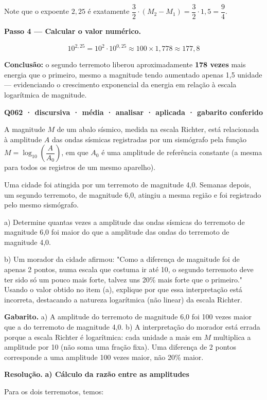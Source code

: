 \documentclass[11pt,a4paper]{article}
\begin{document}
Note que o expoente $2{,}25$ é exatamente $\dfrac{3}{2}\cdot(M_2-M_1) = \dfrac{3}{2}\cdot 1{,}5 = \dfrac{9}{4}$.

\textbf{Passo 4 — Calcular o valor numérico.}

$$10^{2{,}25} = 10^2 \cdot 10^{0{,}25} \approx 100 \times 1{,}778 \approx 177{,}8$$

\textbf{Conclusão:} o segundo terremoto liberou aproximadamente \textbf{178 vezes} mais energia que o primeiro, mesmo a magnitude tendo aumentado apenas 1,5 unidade — evidenciando o crescimento exponencial da energia em relação à escala logarítmica de magnitude.

\bigskip\noindent\textbf{Q062 · discursiva · média · analisar · aplicada · gabarito conferido}\par\nopagebreak
A magnitude $M$ de um abalo sísmico, medida na escala Richter, está relacionada à amplitude $A$ das ondas sísmicas registradas por um sismógrafo pela função $M = \log_{10}\left(\dfrac{A}{A_0}\right)$, em que $A_0$ é uma amplitude de referência constante (a mesma para todos os registros de um mesmo aparelho).

Uma cidade foi atingida por um terremoto de magnitude 4,0. Semanas depois, um segundo terremoto, de magnitude 6,0, atingiu a mesma região e foi registrado pelo mesmo sismógrafo.

a) Determine quantas vezes a amplitude das ondas sísmicas do terremoto de magnitude 6,0 foi maior do que a amplitude das ondas do terremoto de magnitude 4,0.

b) Um morador da cidade afirmou: "Como a diferença de magnitude foi de apenas 2 pontos, numa escala que costuma ir até 10, o segundo terremoto deve ter sido só um pouco mais forte, talvez uns 20\% mais forte que o primeiro." Usando o valor obtido no item (a), explique por que essa interpretação está incorreta, destacando a natureza logarítmica (não linear) da escala Richter.

\textbf{Gabarito.} a) A amplitude do terremoto de magnitude 6,0 foi 100 vezes maior que a do terremoto de magnitude 4,0. b) A interpretação do morador está errada porque a escala Richter é logarítmica: cada unidade a mais em $M$ multiplica a amplitude por 10 (não soma uma fração fixa). Uma diferença de 2 pontos corresponde a uma amplitude 100 vezes maior, não 20\% maior.

\textbf{Resolução.} \textbf{a) Cálculo da razão entre as amplitudes}

Para os dois terremotos, temos:
\end{document}
